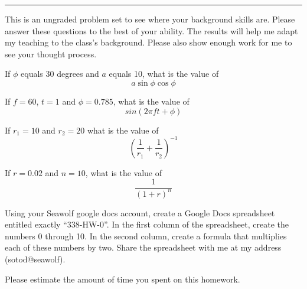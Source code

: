 \documentclass{article}
\begin{document}
\hrule
\vspace{10pt}

This is an ungraded problem set to see where your background skills are.
Please answer these questions to the best of your ability.  The results
will help me adapt my teaching to the class's background.  Please also
show enough work for me to see your thought process.


\problem{}

If $\phi$ equals 30 degrees and $a$ equals 10, what is the value of
$$ a\sin\phi\cos\phi $$


\problem{}

If $f = 60$, $t= 1$ and $\phi = 0.785$, what is the value of
$$ sin(2\pi f t + \phi) $$


\problem{}

If $r_1 = 10$ and $r_2 = 20$ what is the value of
$$ \left(\frac{1}{r_1} + \frac{1}{r_2}\right)^{-1} $$


\problem{}

If $r = 0.02$ and $n = 10$, what is the value of
$$ \frac{1}{(1 + r)^n} $$





Using your Seawolf google docs account, create a Google Docs
spreadsheet entitled exactly ``338-HW-0''.  In the first
column of the spreadsheet, create the numbers 0 through 10.  In the
second column, create a formula that multiplies each of these numbers by
two.  Share the spreadsheet with me at my address (sotod@seawolf).


Please estimate the amount of time you spent on this homework.
\end{document}
